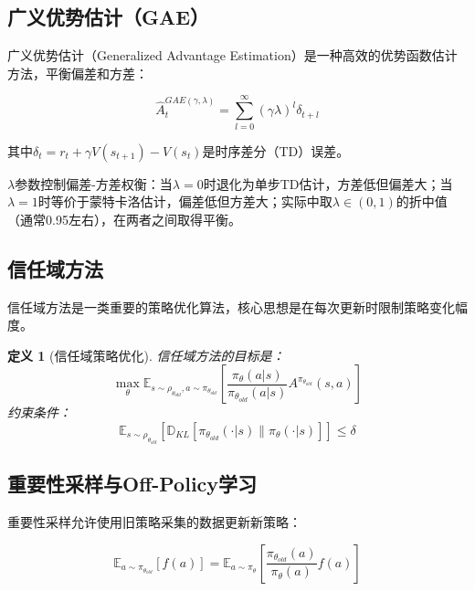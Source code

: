 \documentclass[12pt,a4paper]{article}
\newtheorem{definition}[theorem]{定义}
\begin{document}
\subsection{广义优势估计（GAE）}

广义优势估计（Generalized Advantage Estimation）是一种高效的优势函数估计方法，平衡偏差和方差：

\begin{equation}
\hat{A}_t^{GAE(\gamma,\lambda)} = \sum_{l=0}^{\infty} (\gamma\lambda)^l \delta_{t+l}
\end{equation}

其中$\delta_t = r_t + \gamma V(s_{t+1}) - V(s_t)$是时序差分（TD）误差。

$\lambda$参数控制偏差-方差权衡：当$\lambda = 0$时退化为单步TD估计，方差低但偏差大；当$\lambda = 1$时等价于蒙特卡洛估计，偏差低但方差大；实际中取$\lambda \in (0,1)$的折中值（通常0.95左右），在两者之间取得平衡。

\subsection{信任域方法}

信任域方法是一类重要的策略优化算法，核心思想是在每次更新时限制策略变化幅度。

\begin{definition}[信任域策略优化]
信任域方法的目标是：
\begin{equation}
\max_\theta \mathbb{E}_{s \sim \rho_{\theta_{old}}, a \sim \pi_{\theta_{old}}}\left[\frac{\pi_\theta(a|s)}{\pi_{\theta_{old}}(a|s)} A^{\pi_{\theta_{old}}}(s,a)\right]
\end{equation}
约束条件：
\begin{equation}
\mathbb{E}_{s \sim \rho_{\theta_{old}}}\left[\mathbb{D}_{KL}[\pi_{\theta_{old}}(\cdot|s) \| \pi_\theta(\cdot|s)]\right] \leq \delta
\end{equation}
\end{definition}

\subsection{重要性采样与Off-Policy学习}

重要性采样允许使用旧策略采集的数据更新新策略：

\begin{equation}
\mathbb{E}_{a \sim \pi_{\theta_{old}}}[f(a)] = \mathbb{E}_{a \sim \pi_\theta}\left[\frac{\pi_{\theta_{old}}(a)}{\pi_\theta(a)} f(a)\right]
\end{equation}
\end{document}
